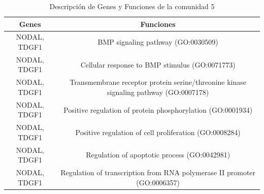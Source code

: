 \begin{table}[!]
    \label{tabla:genes_funciones5}
 	\caption{Descripción de Genes y Funciones de la comunidad 5}
	\centering
	\begin{tabular}{|C|C|}
    \toprule
    \textbf{Genes} & \textbf{Funciones} \\
    \midrule
    NODAL, TDGF1 & BMP signaling pathway (GO:0030509) \\
    NODAL, TDGF1 & Cellular response to BMP stimulus (GO:0071773) \\
    NODAL, TDGF1 & Transmembrane receptor protein serine/threonine kinase signaling pathway (GO:0007178) \\
    NODAL, TDGF1 & Positive regulation of protein phosphorylation (GO:0001934) \\
    NODAL, TDGF1 & Positive regulation of cell proliferation (GO:0008284) \\
    NODAL, TDGF1 & Regulation of apoptotic process (GO:0042981) \\
    NODAL, TDGF1 & Regulation of transcription from RNA polymerase II promoter (GO:0006357) \\
    \bottomrule
 	\end{tabular}
\end{table}




